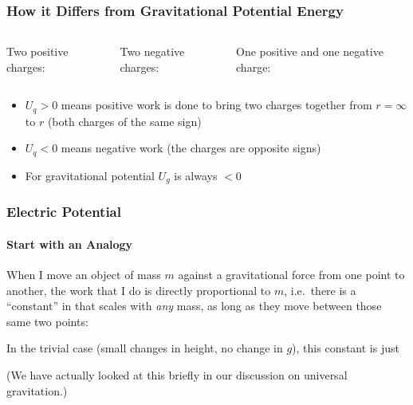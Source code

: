 \documentclass[12pt,aspectratio=169]{beamer}
\newcommand{\eq}[2]{\vspace{#1}{\Large\begin{displaymath}#2\end{displaymath}}}
\begin{document}
\begin{frame}
  \frametitle{How it Differs from Gravitational Potential Energy}
  \begin{columns}
    \begin{center}
      Two positive charges:

      \eq{-.3in}{U_q>0}
    \end{center}
    
    \begin{center}
      Two negative charges:

      \eq{-.3in}{U_q>0}
    \end{center}
    
    \begin{center}
      One positive and one negative charge:

      \eq{-.5in}{U_q<0}
    \end{center}
  \end{columns}

  \vspace{.2in}
  \begin{itemize}
  \item $U_q>0$ means positive work is done to bring two charges together from
   $r=\infty$ to $r$ (both charges of the same sign)
  \item $U_q<0$ means negative work (the charges are opposite signs)
  \item For gravitational potential $U_g$ is always $<0$
  \end{itemize}
\end{frame}

\begin{frame}
  \frametitle{Electric Potential}
  \framesubtitle{Start with an Analogy}

  When I move an object of mass $m$ against a gravitational force from one
  point to another, the work that I do is directly proportional to $m$, i.e.\
  there is a ``constant'' in that scales with \emph{any} mass, as long as they
  move between those same two points:

  \eq{-.25in}{W=\Delta U_g=Km}

  \vspace{-.15in}In the trivial case (small changes in height, no change in
  $g$), this constant is just

  \eq{-.15in}{
    \frac{\Delta U_g}{m}=g\Delta h
  }

  \vspace{-.1in}(We have actually looked at this briefly in our discussion on
  universal gravitation.)
\end{frame}
\end{document}
